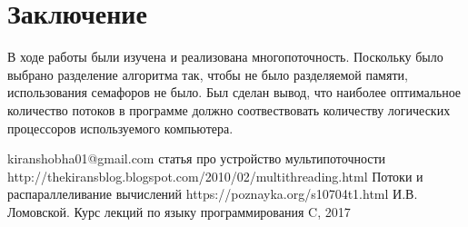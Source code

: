 \documentclass[a4paper, 14pt]{article}
\begin{document}
	\section*{Заключение}
    
	\hspace{1cm}В ходе работы были изучена и реализована многопоточность. Поскольку было выбрано разделение алгоритма так, чтобы не было разделяемой памяти, использования семафоров не было. Был сделан вывод, что наиболее оптимальное количество потоков в программе должно соотвествовать количеству логических процессоров используемого компьютера.
    
    \newpage

    \begin{thebibliography}{11} 
      kiranshobha01@gmail.com статья про устройство мультипоточности http://thekiransblog.blogspot.com/2010/02/multithreading.html
       Потоки и распараллеливание вычислений https://poznayka.org/s10704t1.html
    И.В. Ломовской. Курс лекций по языку программирования C, 2017
    
    \end{thebibliography}
\end{document}
